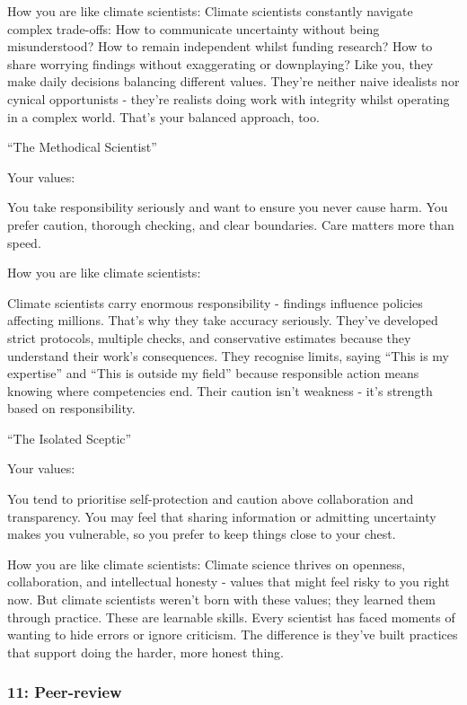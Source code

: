 \documentclass[
  letterpaper,
  DIV=11,
  numbers=noendperiod]{scrartcl}
\begin{document}
How you are like climate scientists: Climate scientists constantly
navigate complex trade-offs: How to communicate uncertainty without
being misunderstood? How to remain independent whilst funding research?
How to share worrying findings without exaggerating or downplaying? Like
you, they make daily decisions balancing different values. They're
neither naive idealists nor cynical opportunists - they're realists
doing work with integrity whilst operating in a complex world. That's
your balanced approach, too.

``The Methodical Scientist''

Your values:

You take responsibility seriously and want to ensure you never cause
harm. You prefer caution, thorough checking, and clear boundaries. Care
matters more than speed.

How you are like climate scientists:

Climate scientists carry enormous responsibility - findings influence
policies affecting millions. That's why they take accuracy seriously.
They've developed strict protocols, multiple checks, and conservative
estimates because they understand their work's consequences. They
recognise limits, saying ``This is my expertise'' and ``This is outside
my field'' because responsible action means knowing where competencies
end. Their caution isn't weakness - it's strength based on
responsibility.

``The Isolated Sceptic''

Your values:

You tend to prioritise self-protection and caution above collaboration
and transparency. You may feel that sharing information or admitting
uncertainty makes you vulnerable, so you prefer to keep things close to
your chest.

How you are like climate scientists: Climate science thrives on
openness, collaboration, and intellectual honesty - values that might
feel risky to you right now. But climate scientists weren't born with
these values; they learned them through practice. These are learnable
skills. Every scientist has faced moments of wanting to hide errors or
ignore criticism. The difference is they've built practices that support
doing the harder, more honest thing.

\subsubsection{11: Peer-review}\label{peer-review}
\end{document}
